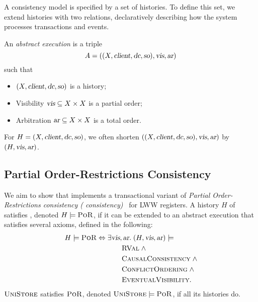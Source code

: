 A consistency model is specified by a set of histories.
To define this set, we extend histories with two relations,
declaratively describing how the system processes transactions
and \fence{} events.

\begin{appdefinition} \label{def:ae}
  An \emph{abstract execution} is a triple
  \[
    A = ((X, \textsl{client}, \textsl{dc}, \textsl{so}), \textsl{vis}, \textsl{ar})
  \]
  such that
  \begin{itemize}
    \item $(X, \textsl{client}, \textsl{dc}, \textsl{so})$ is a history;
    \item Visibility $\textsl{vis} \subseteq X \times X$ is a partial order;
    \item Arbitration $\textsl{ar} \subseteq X \times X$ is a total order.
  \end{itemize}
\end{appdefinition}
For $H = (X, \textsl{client}, \textsl{dc}, \textsl{so})$,
we often shorten $((X, \textsl{client}, \textsl{dc}, \textsl{so}), \textsl{vis}, \textsl{ar})$ by $(H, \textsl{vis}, \textsl{ar})$.
\subsection{Partial Order-Restrictions Consistency} \label{ss:por}

We aim to show that \unistore{} implements a transactional variant
of \emph{Partial Order-Restrictions consistency
(\por{} consistency)}~\cite{red-blue, por} for LWW registers.
A history $H$ of \unistore{} satisfies \por, denoted $H \models \textsc{PoR}$,
if it can be extended to an abstract execution that satisfies several axioms,
defined in the following:
\begin{align*}
  H \models \textsc{PoR} \Leftrightarrow\; &\exists \textsl{vis}, \textsl{ar}.\; (H, \textsl{vis}, \textsl{ar}) \models \\
                 &\qquad \textsc{RVal} \;\land \\
                 &\qquad \textsc{CausalConsistency} \;\land \\
                 &\qquad \textsc{ConflictOrdering} \;\land \\
                 &\qquad \textsc{EventualVisibility}.
\end{align*}
$\textsc{UniStore}$ satisfies $\textsc{PoR}$, denoted $\textsc{UniStore} \models \textsc{PoR}$,
if all its histories do.

